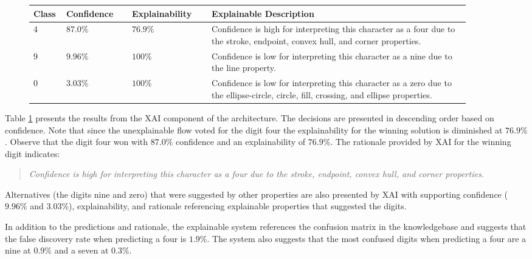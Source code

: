 \begin{figure}[H]
    \renewcommand{\arraystretch}{1.3}
     \label{table:mnist_example1_explanation}
    \begin{center}
    \begin{tabular}{| m{0.06\linewidth} | m{0.14\linewidth} | m{0.17\linewidth} | m{0.55\linewidth} |}
    \hline
     Class & Confidence & Explainability & Explainable Description \\
    \hline \hline
    $4$ & $87.0\%$ & $76.9\%$ & Confidence is high for interpreting this character as a four due to the stroke, endpoint, convex hull, and corner properties. \\ 
    \hline
    $9$ & $9.96\%$ & $100\%$ & Confidence is low for interpreting this character as a nine due to the line property. \\
    \hline
    $0$ & $3.03\%$ & $100\%$ & Confidence is low for interpreting this character as a zero due to the ellipse-circle, circle, fill, crossing, and ellipse properties. \\
    \hline
    \end{tabular}
    \end{center}
\end{figure}

Table \ref{table:mnist_example1_explanation} presents the results from the XAI
component of the architecture. The decisions are presented in descending order
based on confidence.  Note that since the unexplainable flow voted for the digit
four the explainability for the winning solution is diminished at $76.9\%$.
Observe that the digit four won with $87.0\%$ confidence and an explainability
of $76.9\%$.  The rationale provided by XAI for the winning digit indicates:

\begin{quote}
    \textit{Confidence is high for interpreting this character as a four due to the stroke, endpoint, convex hull, and corner properties.}
\end{quote}

Alternatives (the digits nine and zero) that were suggested by other properties
are also presented by XAI with supporting confidence ($9.96\%$ and $3.03\%$),
explainability, and rationale referencing explainable properties that suggested
the digits.

In addition to the predictions and rationale, the explainable system references
the confusion matrix in the knowledgebase and suggests that the false discovery
rate when predicting a four is $1.9\%$.  The system also suggests that the most
confused digits when predicting a four are a nine at $0.9\%$ and a seven at
$0.3\%$.

